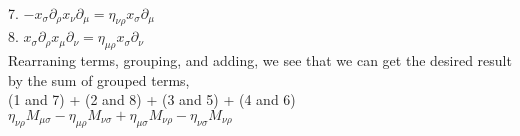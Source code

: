 \documentclass[prb,preprint]
{revtex4-1}
\begin{document}
\\
7.  $-x_\sigma \partial_\rho x_\nu \partial_\mu = \eta_{\nu\rho} x_\sigma \partial_\mu$
\\
8.  $x_\sigma \partial_\rho x_\mu \partial_\nu = \eta_{\mu\rho} x_\sigma \partial_\nu$
\\
Rearraning terms, grouping, and adding, we see that we can get the desired result by the sum of grouped terms, 
\\
(1 and 7) + (2 and 8) + (3 and 5) + (4 and 6)
\\
$\eta_{\nu\rho}M_{\mu\sigma} - \eta_{\mu\rho}M_{\nu\sigma} + \eta_{\mu\sigma}M_{\nu\rho} - \eta_{\nu\sigma}M_{\nu\rho}$







\end{document}

